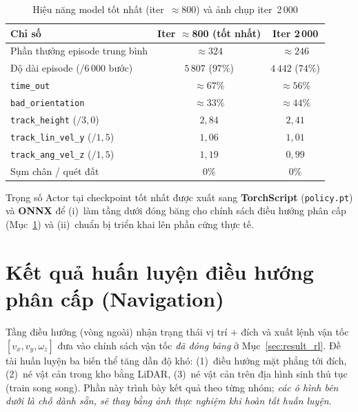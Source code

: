 \begin{table}[H]
    \centering
    \caption{Hiệu năng model tốt nhất (iter~$\approx$800) và ảnh chụp iter~2\,000}
    \label{tab:best_model}
    \renewcommand{\arraystretch}{1.3}
    \begin{tabular}{lcc}
        \toprule
        \textbf{Chỉ số} & \textbf{Iter $\approx$800 (tốt nhất)} & \textbf{Iter 2\,000} \\
        \midrule
        Phần thưởng episode trung bình        & $\approx 324$ & $\approx 246$ \\
        Độ dài episode (/6\,000 bước)         & $5\,807$ ($97\%$) & $4\,442$ ($74\%$) \\
        \texttt{time\_out}                    & $\approx 67\%$ & $\approx 56\%$ \\
        \texttt{bad\_orientation}             & $\approx 33\%$ & $\approx 44\%$ \\
        \texttt{track\_height} ($/3{,}0$)     & $2{,}84$ & $2{,}41$ \\
        \texttt{track\_lin\_vel\_y} ($/1{,}5$) & $1{,}06$ & $1{,}01$ \\
        \texttt{track\_ang\_vel\_z} ($/1{,}5$) & $1{,}19$ & $0{,}99$ \\
        Sụm chân / quét đất                   & $0\%$ & $0\%$ \\
        \bottomrule
    \end{tabular}
\end{table}

Trọng số Actor tại checkpoint tốt nhất được xuất sang \textbf{TorchScript}
(\texttt{policy.pt}) và \textbf{ONNX} để (i)~làm tầng dưới đóng băng cho chính
sách điều hướng phân cấp (Mục~\ref{sec:result_nav}) và (ii)~chuẩn bị triển khai
lên phần cứng thực tế.


\section{Kết quả huấn luyện điều hướng phân cấp (Navigation)}
\label{sec:result_nav}

Tầng điều hướng (vòng ngoài) nhận trạng thái vị trí + đích và xuất lệnh vận tốc
$[v_{x},v_{y},\omega_z]$ đưa vào chính sách vận tốc \emph{đã đóng băng} ở
Mục~\ref{sec:result_rl}. Đề tài huấn luyện ba biến thể tăng dần độ khó:
(1)~điều hướng mặt phẳng tới đích, (2)~né vật cản trong kho bằng LiDAR,
(3)~né vật cản trên địa hình sinh thủ tục (train song song). Phần này trình bày
kết quả theo từng nhóm; \emph{các ô hình bên dưới là chỗ dành sẵn, sẽ thay bằng
ảnh thực nghiệm khi hoàn tất huấn luyện}.


